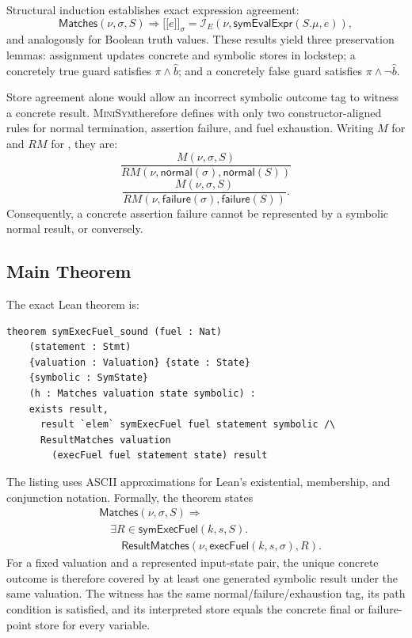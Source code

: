 \documentclass[10pt,twocolumn]{article}
\newcommand{\tool}{\textsc{MiniSym}}
\newcommand{\code}[1]{\texttt{\detokenize{#1}}}
\newcommand{\llbracket}{\mathopen{[\![}}
\newcommand{\rrbracket}{\mathclose{]\!]}}
\begin{document}
Structural induction establishes exact expression agreement:
\[
 \mathsf{Matches}(\nu,\sigma,S)\Rightarrow
 \llbracket e\rrbracket_\sigma =
 \mathcal I_E(\nu,\mathsf{symEvalExpr}(S.\mu,e)),
\]
and analogously for Boolean truth values.  These results yield three preservation
lemmas: assignment updates concrete and symbolic stores in lockstep; a concretely
true guard satisfies $\pi\land\widehat b$; and a concretely false guard satisfies
$\pi\land\neg\widehat b$.

Store agreement alone would allow an incorrect symbolic outcome tag to witness a
concrete result.  \tool therefore defines \code{ResultMatches} with only two
constructor-aligned rules for normal termination, assertion failure, and fuel
exhaustion.  Writing $M$ for \code{Matches} and $RM$ for
\code{ResultMatches}, they are:
\[
 \frac{M(\nu,\sigma,S)}
      {RM(\nu,\mathsf{normal}(\sigma),\mathsf{normal}(S))}
\]
\[
 \frac{M(\nu,\sigma,S)}
      {RM(\nu,\mathsf{failure}(\sigma),\mathsf{failure}(S))}.
\]
Consequently, a concrete assertion failure cannot be represented by a symbolic
normal result, or conversely.

\subsection{Main Theorem}

The exact Lean theorem is:

\begin{lstlisting}
theorem symExecFuel_sound (fuel : Nat)
    (statement : Stmt)
    {valuation : Valuation} {state : State}
    {symbolic : SymState}
    (h : Matches valuation state symbolic) :
    exists result,
      result `elem` symExecFuel fuel statement symbolic /\
      ResultMatches valuation
        (execFuel fuel statement state) result
\end{lstlisting}

The listing uses ASCII approximations for Lean's existential, membership, and
conjunction notation.  Formally, the theorem states
\begin{align*}
 &\mathsf{Matches}(\nu,\sigma,S)\Rightarrow\\[-2pt]
 &\quad\exists R\in\mathsf{symExecFuel}(k,s,S).\\[-2pt]
 &\qquad \mathsf{ResultMatches}(\nu,\mathsf{execFuel}(k,s,\sigma),R).
\end{align*}
For a fixed valuation and a represented input-state pair, the unique concrete
outcome is therefore covered by at least one generated symbolic result under the
same valuation.  The witness has the same normal/failure/exhaustion tag, its path condition
is satisfied, and its interpreted store equals the concrete final or
failure-point store for every variable.
\end{document}
